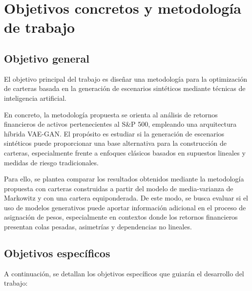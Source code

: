 \clearpage
\chapter{Objetivos concretos y metodología de trabajo}

\section{Objetivo general}

El objetivo principal del trabajo es diseñar una metodología para la optimización de carteras basada en la generación de escenarios sintéticos mediante técnicas de inteligencia artificial.

En concreto, la metodología propuesta se orienta al análisis de retornos financieros de activos pertenecientes al S\&P 500, empleando una arquitectura híbrida VAE-GAN. El propósito es estudiar si la generación de escenarios sintéticos puede proporcionar una base alternativa para la construcción de carteras, especialmente frente a enfoques clásicos basados en supuestos lineales y medidas de riesgo tradicionales.

Para ello, se plantea comparar los resultados obtenidos mediante la metodología propuesta con carteras construidas a partir del modelo de media-varianza de Markowitz y con una cartera equiponderada. De este modo, se busca evaluar si el uso de modelos generativos puede aportar información adicional en el proceso de asignación de pesos, especialmente en contextos donde los retornos financieros presentan colas pesadas, asimetrías y dependencias no lineales.

\section{Objetivos específicos}

A continuación, se detallan los objetivos específicos que guiarán el desarrollo del trabajo:

